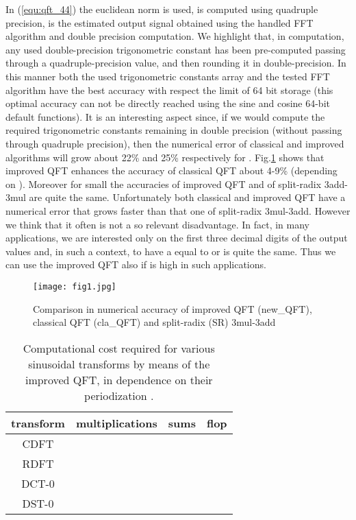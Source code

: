 \documentclass[a4paper,10pt]{article}
\begin{document}
In (\ref{equ:qft_44}) the euclidean norm is used,  is computed using quadruple precision,  is the estimated output signal obtained using the handled FFT algorithm and double precision computation.  
We highlight that, in  computation, any used double-precision trigonometric constant has been pre-computed passing through a quadruple-precision value, and then rounding it in double-precision.
In this manner both the used trigonometric constants array and the tested FFT algorithm have the best accuracy with respect the limit of 64 bit storage (this optimal accuracy can not be directly reached using the sine and cosine 64-bit default functions). 
It is an interesting aspect since, if we would compute the required trigonometric constants remaining in double precision (without passing through quadruple precision), then the numerical error of  classical and improved algorithms will grow about 22\% and 25\% respectively for .
Fig.\ref{fig:accuracy} shows that improved QFT enhances the accuracy of classical QFT about 4-9\% (depending on ).
Moreover for small  the accuracies of improved QFT and of split-radix 3add-3mul are quite the same. 
Unfortunately both classical and improved QFT have a numerical error that grows faster than that one of split-radix 3mul-3add.
However we think that it often is not a so relevant disadvantage.
In fact, in many applications, we are interested only on the first three decimal digits of the output values  and, in such a context, to have a  equal to  or  is quite the same. 
Thus we can use the improved QFT also if  is high in such applications.



\begin{figure}[htb]
  \centering
  \texttt{[image: fig1.jpg]}
  \caption{Comparison in numerical accuracy of improved QFT (new\_QFT), classical QFT (cla\_QFT) and split-radix (SR) 3mul-3add}
  \label{fig:accuracy}
\end{figure}










\begin{table}[tb]
\caption{Computational cost required for various sinusoidal transforms by means of the improved QFT, in dependence on their periodization .} 
\label{tab:costo_improved_qft}
\centering
\scalebox{0.8}
{
\begin{tabular}{cccc}
\toprule
\cmidrule{2-4}
transform & multiplications & sums & flop \\
\midrule
CDFT &  &  &  \\
RDFT &  &  &   \\
DCT-0 &  &  &  \\
DST-0 &  &   &  \\
\bottomrule
\end{tabular}
} 
\end{table}
\end{document}
